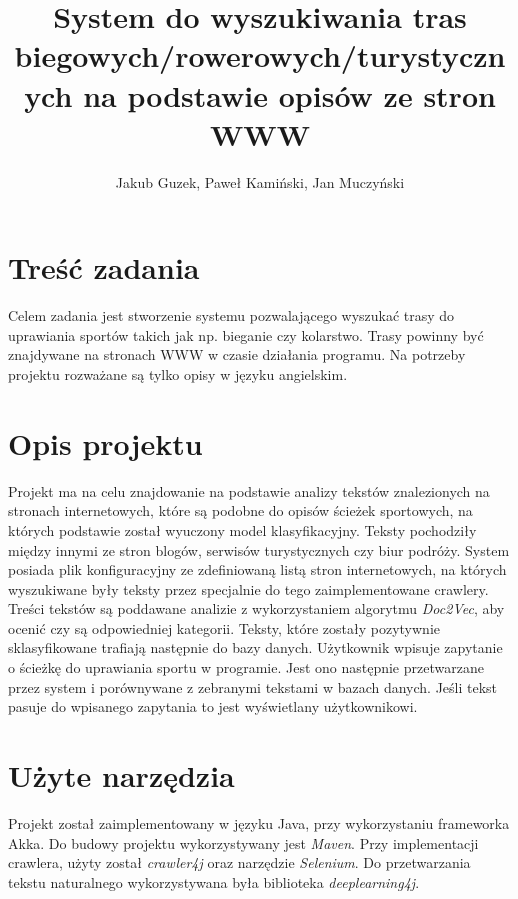 \documentclass[titlepage]{article}
\title{System do wyszukiwania tras biegowych/rowerowych/turystycznych na podstawie opisów ze stron WWW}
\author{Jakub Guzek, Paweł Kamiński, Jan Muczyński}
\begin{document}
\maketitle

\section{Treść zadania}
Celem zadania jest stworzenie systemu pozwalającego wyszukać trasy do uprawiania sportów takich jak np. bieganie czy kolarstwo. Trasy powinny być znajdywane na stronach WWW w czasie działania programu. Na potrzeby projektu rozważane są tylko opisy w języku angielskim.

\section{Opis projektu}
Projekt ma na celu znajdowanie na podstawie analizy tekstów znalezionych na stronach internetowych, które są podobne do opisów ścieżek sportowych, na których podstawie został wyuczony model klasyfikacyjny. Teksty pochodziły między innymi ze stron blogów, serwisów turystycznych czy biur podróży. System posiada plik konfiguracyjny ze zdefiniowaną listą stron internetowych, na których wyszukiwane były teksty przez specjalnie do tego zaimplementowane crawlery. Treści tekstów są poddawane analizie z wykorzystaniem algorytmu \textit{Doc2Vec}, aby ocenić czy są odpowiedniej kategorii. Teksty, które zostały pozytywnie sklasyfikowane trafiają następnie do bazy danych.
Użytkownik wpisuje zapytanie o ścieżkę do uprawiania sportu w programie. Jest ono następnie przetwarzane przez system i porównywane z zebranymi tekstami w bazach danych. Jeśli tekst pasuje do wpisanego zapytania to jest wyświetlany użytkownikowi.


\section{Użyte narzędzia}
Projekt został zaimplementowany w języku Java, przy wykorzystaniu frameworka Akka. Do budowy projektu wykorzystywany jest \textit{Maven}. Przy implementacji crawlera, użyty został \textit{crawler4j} oraz narzędzie \textit{Selenium}. Do przetwarzania tekstu naturalnego wykorzystywana była biblioteka \textit{deeplearning4j}.
\end{document}
